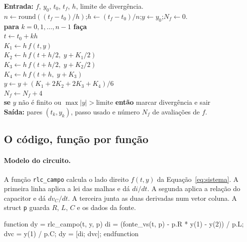 \begin{algoritmo}[htbp]
\centering
\caption{Runge-Kutta de quarta ordem com passo fixo e parada por divergência.}
\label{alg:rk4}
\begin{minipage}{0.94\textwidth}
\noindent\textbf{Entrada:} \(f\), \(y_0\), \(t_0\), \(t_f\), \(h\), limite de divergência.\\[0.3em]
\(n\leftarrow\mathrm{round}((t_f-t_0)/h)\);\quad \(h\leftarrow(t_f-t_0)/n\);\quad \(y\leftarrow y_0\);\quad \(N_f\leftarrow 0\).\\[0.3em]
\textbf{para} \(k=0,1,\ldots,n-1\) \textbf{faça}\\[0.2em]
\hspace*{1.2em}\(t\leftarrow t_0+kh\)\\
\hspace*{1.2em}\(K_1\leftarrow h\,f(t,y)\)\\
\hspace*{1.2em}\(K_2\leftarrow h\,f(t+h/2,\; y+K_1/2)\)\\
\hspace*{1.2em}\(K_3\leftarrow h\,f(t+h/2,\; y+K_2/2)\)\\
\hspace*{1.2em}\(K_4\leftarrow h\,f(t+h,\; y+K_3)\)\\
\hspace*{1.2em}\(y\leftarrow y+(K_1+2K_2+2K_3+K_4)/6\)\\
\hspace*{1.2em}\(N_f\leftarrow N_f+4\)\\
\hspace*{1.2em}\textbf{se} \(y\) não é finito ou \(\max|y|>\mathrm{limite}\) \textbf{então} marcar divergência e sair\\[0.3em]
\textbf{Saída:} pares \((t_k,y_k)\), passo usado e número \(N_f\) de avaliações de \(f\).
\end{minipage}
\end{algoritmo}

\subsection{O código, função por função}

\paragraph{Modelo do circuito.} A função \texttt{rlc\_campo} calcula o lado direito \(f(t,y)\) da Equação~\eqref{eq:sistema}. A primeira linha aplica a lei das malhas e dá \(di/dt\). A segunda aplica a relação do capacitor e dá \(dv_C/dt\). A terceira junta as duas derivadas num vetor coluna. A struct \texttt{p} guarda \(R\), \(L\), \(C\) e os dados da fonte.
\begin{codigo}
function dy = rlc_campo(t, y, p)
    di = (fonte_vs(t, p) - p.R * y(1) - y(2)) / p.L;
    dvc = y(1) / p.C;
    dy = [di; dvc];
endfunction
\end{codigo}

